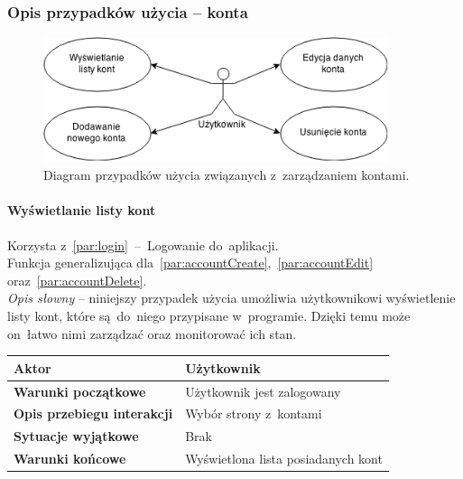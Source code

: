 \subsubsection{Opis przypadków użycia -- konta}

\begin{figure}[H]
  \centering
  \includegraphics[width=0.9\textwidth]{images/use-cases-accounts.png}
  \caption{Diagram przypadków użycia związanych z~zarządzaniem kontami.}
\end{figure}

\newpage
\paragraph{Wyświetlanie listy kont\newline}
\label{par:accountsView}
Korzysta z~\ref{par:login}~--~Logowanie do~aplikacji.\\
\indent Funkcja generalizująca dla~\ref{par:accountCreate},~\ref{par:accountEdit} oraz~\ref{par:accountDelete}.\\

\textit{Opis słowny} -- niniejszy przypadek użycia umożliwia użytkownikowi wyświetlenie listy kont, które są~do~niego przypisane w~programie. Dzięki temu może on~łatwo nimi zarządzać oraz monitorować ich stan.\\

\begin{tabular}{|l|l|}
  \hline \textbf{Aktor} & Użytkownik \\ \hline
  \textbf{Warunki początkowe} & Użytkownik jest zalogowany \\ \hline
  \textbf{Opis przebiegu interakcji} & Wybór strony z~kontami \\ \hline
  \textbf{Sytuacje wyjątkowe} & Brak \\ \hline
  \textbf{Warunki końcowe} & Wyświetlona lista posiadanych kont \\ \hline
\end{tabular}\\\\

